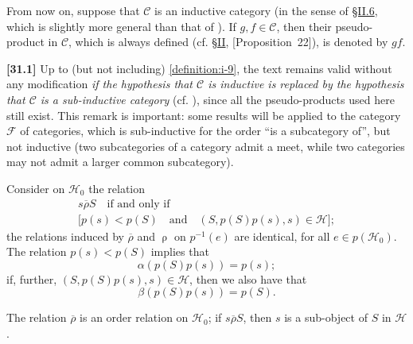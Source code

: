 \documentclass[a4paper,fleqn]{article}
\theoremstyle{plain}
\newenvironment{proposition}[1]
  {\renewcommand\theinnerproposition{#1}\innerproposition}
  {\endinnerproposition}
\theoremstyle{definition}
\newenvironment{longcomm}[1]
  {\noindent\textbf{[#1]}\rmfamily}
  {}
\newcommand{\textand}{\quad\text{and}\quad}
\newcommand{\CC}{\mathcal{C}}
\newcommand{\HH}{\mathcal{H}}
\newcommand{\FF}{\mathcal{F}}
\newcommand{\relrho}{\mathrel{\rho}}
\newcommand{\relrhobar}{\mathrel{\overline{\rho}}}
\begin{document}
From now on, suppose that $\CC$ is an inductive category (in the sense of \hyperref[section:ii.6]{§II.6}, which is slightly more general than that of \cite{3c}).
If $g,f\in\CC$, then their pseudo-product in $\CC$, which is always defined (cf. \hyperref[section:ii]{§II}, \hyperref[proposition:i-22][Proposition~22]), is denoted by $gf$.

\begin{longcomm}{31.1}
  Up to (but not including) \cref{definition:i-9}, the text remains valid without any modification \emph{if the hypothesis that $\CC$ is inductive is replaced by the hypothesis that $\CC$ is a sub-inductive category} (cf. \cite{coll69}), since all the pseudo-products used here still exist.
  This remark is important: some results will be applied to the category $\FF$ of categories, which is sub-inductive for the order ``is a subcategory of'', but not inductive (two subcategories of a category admit a meet, while two categories may not admit a larger common subcategory).
\end{longcomm}

Consider on $\HH_0$ the relation
\[
  \begin{gathered}
    s\relrhobar S
    \quad\text{if and only if}\quad
  \\\big[p(s)<p(S)
    \textand
    (S,p(S)p(s),s)\in\HH\big];
  \end{gathered}
\]
the relations induced by $\relrhobar$ and $\relrho$ on $p^{-1}(e)$ are identical, for all $e\in p(\HH_0)$.
The relation $p(s)<p(S)$ implies that
\[
  \alpha(p(S)p(s))
  = p(s);
\]
if, further, $(S,p(S)p(s),s)\in\HH$, then we also have that
\[
  \beta(p(S)p(s))
  = p(S).
\]

\begin{proposition}{3}
\label{proposition:i-3}
  The relation $\relrhobar$ is an order relation on $\HH_0$;
  if $s\relrhobar S$, then $s$ is a sub-object \cite{5} of $S$ in $\HH$.
\end{proposition}
\end{document}
